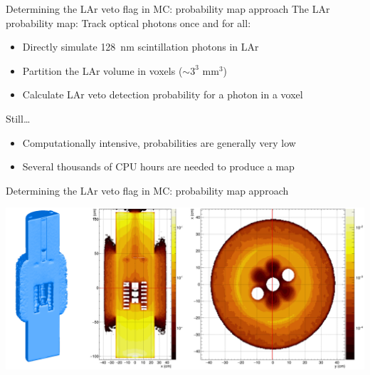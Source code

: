 \documentclass[10pt,aspectratio=169]{beamer}
\begin{document}
\begin{frame}{Determining the LAr veto flag in MC: probability map approach}
  The LAr probability map: Track optical photons once and for all:
  \begin{itemize}
    \item Directly simulate \alert{128~nm} scintillation photons in LAr
    \item Partition the LAr volume in \alert{voxels} ($\sim3^3$ mm$^3$)
    \item Calculate LAr veto \alert{detection probability} for a photon in a voxel
  \end{itemize}
  Still\ldots
  \begin{itemize}
    \item Computationally intensive, probabilities are generally very low
    \item Several thousands of CPU hours are needed to produce a map
  \end{itemize}
\end{frame}
\begin{frame}{Determining the LAr veto flag in MC: probability map approach}
  \begin{center}
    \includegraphics[width=\textwidth]{plots/bkg/lar/ph2/larmodel/larmap-tac.png}
  \end{center}
\end{frame}
\end{document}

